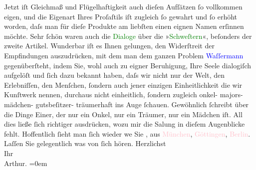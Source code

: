                Jetzt iſt Gleichmaß und {\pb}Flügelhaftigkeit auch dieſen
               Aufſätzen ſo vollkommen eigen,  und die
               Eigenart  Ihres Proſaſtils iſt zugleich ſo gewahrt
               und ſo erhöht worden, daſs man für dieſe Produkte am liebſten einen eignen Namen
               erſinnen möchte. Sehr ſchön waren auch die \textcolor{green}{Dialoge}{} über die »\textcolor{green}{Schweſtern}{}\ledrightnote{\textcolor{green}{Die Schwestern. Drei Novellen}}«, beſonders der zweite Artikel. Wunderbar iſt es Ihnen gelungen,
               den Widerſtreit der Empfindungen auszudrücken, mit dem man dem ganzen Problem {\pb}\textcolor{blue}{Waſſermann}{}\ledrightnote{\textcolor{blue}{Jakob Wassermann}} gegenüberſteht, indem Sie, wohl auch
               zu eigner Beruhigung, Ihre Seele dialogiſch aufgelöſt und ſich dazu bekannt haben,
               daſs wir nicht nur der Welt, den Erlebniſſen, den Menſchen, ſondern auch jener
               einzigen Einheitlichkeit die wir Kunſtwerk nennen, durchaus nicht einheitlich,
               ſondern zugleich onkel- majors- mädchen- gutsbeſitzer- träumerhaft ins Auge ſchauen.
               Gewöhnlich ſchreibt über die Dinge Einer, der nur ein Onkel, {\pb}nur ein Träumer, nur ein Mädchen iſt. All dies ließe ſich
               richtiger ausdrücken, wozu mir die Sa{\geminationm}lung in dieſem
               Augenblicke fehlt.\pend
           \pstart
           Hoffentlich ſieht man ſich wieder we{\geminationn} Sie \label{K_L01638_2v}\label{K_L01638_2h}, aus \textcolor{pink}{München}{}\ledrightnote{\textcolor{pink}{München}}, \textcolor{pink}{Göttingen}{}\ledrightnote{\textcolor{pink}{Göttingen}}, \textcolor{pink}{Berlin}{}\ledrightnote{\textcolor{pink}{Berlin}}. Laſſen Sie gelegentlich
               was von ſich hören.\pend
           \pstart
           Herzlichst{\\[\baselineskip]}Ihr{\\[\baselineskip]}\spacefill\mbox{Arthur.}\pend
           \leftskip=0em{}\endnumbering{}  
      
